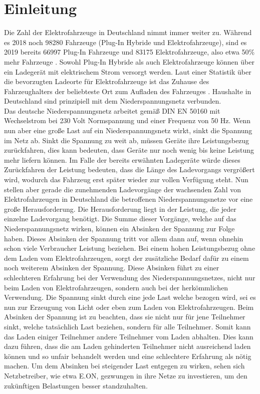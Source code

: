 \chapter{Einleitung}

Die Zahl der Elektrofahrzeuge in Deutschland nimmt immer weiter zu. Während es 2018 noch 98280 Fahrzeuge (Plug-In Hybride und Elektrofahrzeuge), sind es 2019 bereits 66997 Plug-In Fahrzeuge und 83175 Elektrofahrzeuge, also etwa 50\% mehr Fahrzeuge \cite{intro_stat_1}. Sowohl Plug-In Hybride als auch Elektrofahrzeuge können über ein Ladegerät mit elektrischem Strom versorgt werden. Laut einer Statistik über die bevorzugten Ladeorte für Elektrofahrzeuge ist das Zuhause des Fahrzeughalters der beliebteste Ort zum Aufladen des Fahrzeuges \cite{intro_stat_2}. Haushalte in Deutschland sind prinzipiell mit dem Niederspannungsnetz verbunden. \\
Das deutsche Niederspannungsnetz arbeitet gemäß DIN EN 50160 mit Wechselstrom bei 230 Volt Normspannung und einer Frequenz von 50 Hz. Wenn nun aber eine große Last auf ein Niederspannungsnetz wirkt, sinkt die Spannung im Netz ab. Sinkt die Spannung zu weit ab, müssen Geräte ihre Leistungsbezug zurückfahren, dies kann bedeuten, dass Geräte nur noch wenig bis keine Leistung mehr liefern können. Im Falle der bereits erwähnten Ladegeräte würde dieses Zurückfahren der Leistung bedeuten, dass die Länge des Ladevorgangs vergrößert wird, wodurch das Fahrzeug erst später wieder zur vollen Verfügung steht. Nun stellen aber gerade die zunehmenden Ladevorgänge der wachsenden Zahl von Elektrofahrzeugen in Deutschland die betroffenen Niederspannungsnetze vor eine große Herausforderung. Die Herausforderung liegt in der Leistung, die jeder einzelne Ladevorgang benötigt. Die Summe dieser Vorgänge, welche auf das Niederspannungsnetz wirken, können ein Absinken der Spannung zur Folge haben. Dieses Absinken der Spannung tritt vor allem dann auf, wenn ohnehin schon viele Verbraucher Leistung beziehen. Bei einem hohen Leistungsbezug ohne dem Laden vom Elektrofahrzeugen, sorgt der zusätzliche Bedarf dafür zu einem noch weiterem Absinken der Spannung. Diese Absinken führt zu einer schlechteren Erfahrung bei der Verwendung des Niederspannungsnetzes, nicht nur beim Laden von Elektrofahrzeugen, sondern auch bei der herkömmlichen Verwendung. Die Spannung sinkt durch eine jede Last welche bezogen wird, sei es nun zur Erzeugung von Licht oder eben zum Laden von Elektrofahrzeugen. Beim Absinken der Spannung ist zu beachten, dass sie nicht nur für jene Teilnehmer sinkt, welche tatsächlich Last beziehen, sondern für alle Teilnehmer. Somit kann das Laden einiger Teilnehmer andere Teilnehmer vom Laden abhalten. Dies kann dazu führen, dass die am Laden gehinderten Teilnehmer nicht ausreichend laden können und so unfair behandelt werden und eine schlechtere Erfahrung als nötig machen. Um dem Absinken bei steigender Last entgegen zu wirken, sehen sich Netzbetreiber, wie etwa E.ON, gezwungen in ihre Netze zu investieren, um den zukünftigen Belastungen besser standzuhalten. \\
